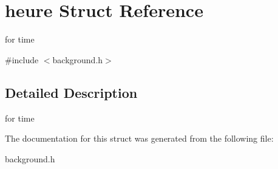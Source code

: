 \hypertarget{structheure}{}\section{heure Struct Reference}
\label{structheure}


for time  




{\ttfamily \#include $<$background.\+h$>$}



\subsection{Detailed Description}
for time 

The documentation for this struct was generated from the following file\+:\begin{DoxyCompactItemize}
\item 
background.\+h\end{DoxyCompactItemize}
